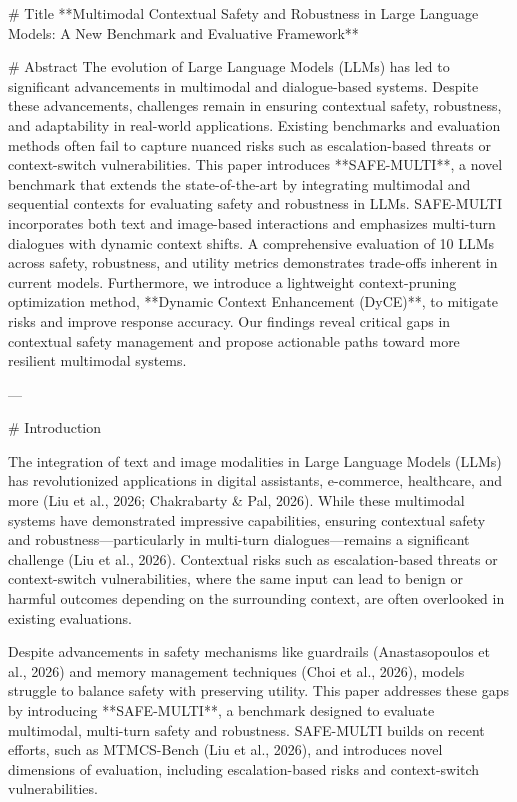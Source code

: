 # Title  
**Multimodal Contextual Safety and Robustness in Large Language Models: A New Benchmark and Evaluative Framework**

# Abstract  
The evolution of Large Language Models (LLMs) has led to significant advancements in multimodal and dialogue-based systems. Despite these advancements, challenges remain in ensuring contextual safety, robustness, and adaptability in real-world applications. Existing benchmarks and evaluation methods often fail to capture nuanced risks such as escalation-based threats or context-switch vulnerabilities. This paper introduces **SAFE-MULTI**, a novel benchmark that extends the state-of-the-art by integrating multimodal and sequential contexts for evaluating safety and robustness in LLMs. SAFE-MULTI incorporates both text and image-based interactions and emphasizes multi-turn dialogues with dynamic context shifts. A comprehensive evaluation of 10 LLMs across safety, robustness, and utility metrics demonstrates trade-offs inherent in current models. Furthermore, we introduce a lightweight context-pruning optimization method, **Dynamic Context Enhancement (DyCE)**, to mitigate risks and improve response accuracy. Our findings reveal critical gaps in contextual safety management and propose actionable paths toward more resilient multimodal systems.

---

# Introduction  

The integration of text and image modalities in Large Language Models (LLMs) has revolutionized applications in digital assistants, e-commerce, healthcare, and more (Liu et al., 2026; Chakrabarty & Pal, 2026). While these multimodal systems have demonstrated impressive capabilities, ensuring contextual safety and robustness—particularly in multi-turn dialogues—remains a significant challenge (Liu et al., 2026). Contextual risks such as escalation-based threats or context-switch vulnerabilities, where the same input can lead to benign or harmful outcomes depending on the surrounding context, are often overlooked in existing evaluations.

Despite advancements in safety mechanisms like guardrails (Anastasopoulos et al., 2026) and memory management techniques (Choi et al., 2026), models struggle to balance safety with preserving utility. This paper addresses these gaps by introducing **SAFE-MULTI**, a benchmark designed to evaluate multimodal, multi-turn safety and robustness. SAFE-MULTI builds on recent efforts, such as MTMCS-Bench (Liu et al., 2026), and introduces novel dimensions of evaluation, including escalation-based risks and context-switch vulnerabilities.

